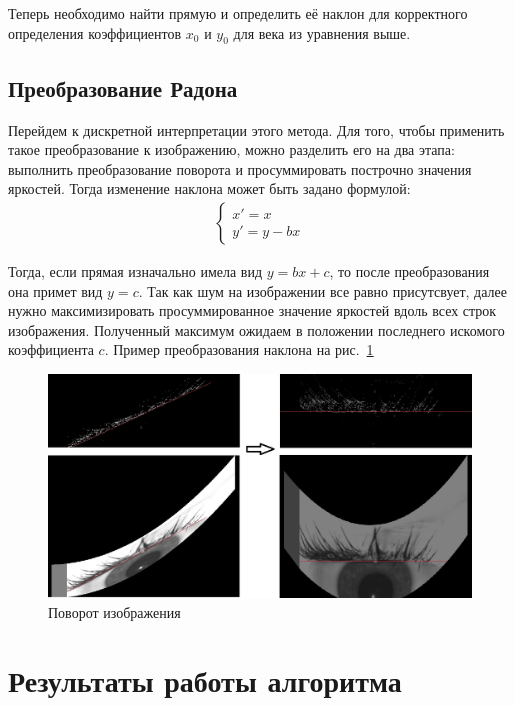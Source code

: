 \documentclass[12pt,a4paper]{article} %
\begin{document}
Теперь необходимо найти прямую и определить её наклон для корректного определения коэффициентов $x_0$ и $y_0$ для века из уравнения выше.
 
\newpage
\subsection{Преобразование Радона}

Перейдем к дискретной интерпретации этого метода. Для того, чтобы применить такое преобразование к изображению, можно разделить его на два этапа: выполнить преобразование поворота и просуммировать построчно значения яркостей. Тогда изменение наклона может быть задано формулой:
\begin{gather}\label{nakl}
	\begin{cases}
		x' = x
		\\
		y' = y - bx
	\end{cases}
\end{gather}

Тогда, если прямая изначально имела вид $y=bx+c$, то после преобразования она примет вид $y = c$. Так как шум на изображении все равно присутсвует, далее нужно максимизировать просуммированное значение яркостей вдоль всех строк изображения. Полученный максимум ожидаем в положении последнего искомого коэффициента $c$. Пример преобразования наклона на рис.~\ref{fig:nakl}

\begin{figure}[h]
	
	\centering
	
	\includegraphics[width=0.8\linewidth]{nakl.jpg}
	
	\caption{Поворот изображения}
	
	\label{fig:nakl}
	
\end{figure}



\newpage
\section{Результаты работы алгоритма}
\end{document}
